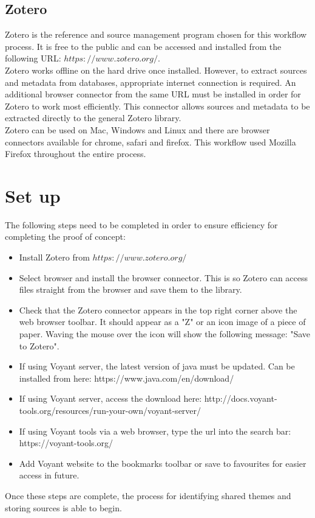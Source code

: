 \documentclass{article}
\begin{document}
\subsection{Zotero}
Zotero is the reference and source management program chosen for this workflow process. It is free to the public and can be accessed and installed from the following URL: $https://www.zotero.org/.$\\
Zotero works offline on the hard drive once installed. However, to extract sources and metadata from databases, appropriate internet connection is required. An additional browser connector from the same URL must be installed in order for Zotero to work most efficiently. This connector allows sources and metadata to be extracted directly to the general Zotero library.\\
Zotero can be used on Mac, Windows and Linux and there are browser connectors available for chrome, safari and firefox. This workflow used Mozilla Firefox throughout the entire process. 


\section{Set up}
The following steps need to be completed in order to ensure efficiency for completing the proof of concept:
\begin{itemize}
    \item Install Zotero from $https://www.zotero.org/$
    \item Select browser and install the browser connector. This is so Zotero can access files straight from the browser and save them to the library.
    \item Check that the Zotero connector appears in the top right corner above the web browser toolbar. It should appear as a "Z" or an icon image of a piece of paper. Waving the mouse over the icon will show the following message: "Save to Zotero". 
    \item If using Voyant server, the latest version of java must be updated. Can be installed from here: https://www.java.com/en/download/
    \item If using Voyant server, access the download here: http://docs.voyant-tools.org/resources/run-your-own/voyant-server/
    \item If using Voyant tools via a web browser, type the url into the search bar: https://voyant-tools.org/
    \item Add Voyant website to the bookmarks toolbar or save to favourites for easier access in future.
\end{itemize}
Once these steps are complete, the process for identifying shared themes and storing sources is able to begin. 
\end{document}
